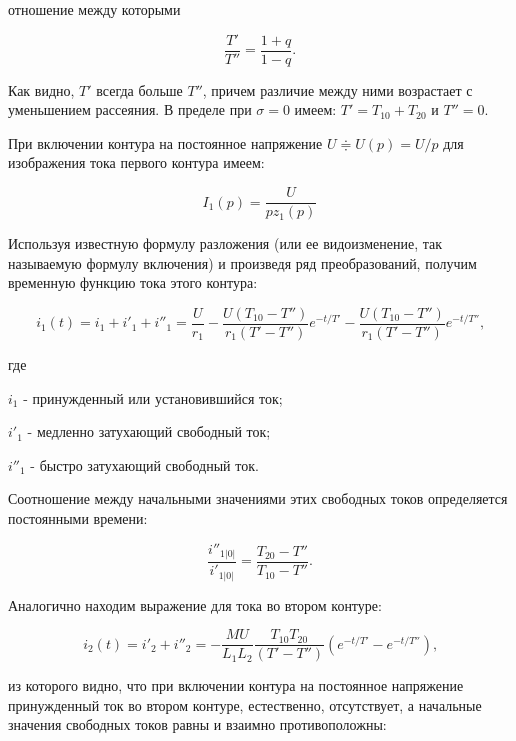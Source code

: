 отношение между которыми

\begin{equation}
    \label{eq:4-12 T'T''}
    \frac{T'}{T''}=\frac{1+q}{1-q}\text{.}
\end{equation}

Как видно, $ T' $ всегда больше $ T'' $, причем различие между ними возрастает с уменьшением рассеяния. В пределе при $ \sigma = 0 $ имеем: $ T' = T_{10} + T_{20} $ и $ T'' = 0 $.

При включении контура на постоянное напряжение $ U \Doteq U(p) = U/p $ для изображения тока первого контура имеем:

\begin{equation*}
    I_1(p)=\frac{U}{pz_1(p)}
\end{equation*}

Используя известную формулу разложения (или ее видоизменение, так называемую формулу включения) и произведя ряд преобразований, получим временную функцию тока этого контура:

\begin{equation}
    \label{eq:4-13 i_1}
    i_1(t)=i_1+i'_1+i''_1=\frac{U}{r_1}-\frac{U(T_{10}-T'')}{r_1(T'-T'')}e^{-t/T'}-\frac{U(T_{10}-T'')}{r_1(T'-T'')}e^{-t/T''}\text{,}
\end{equation}

где

$ i_1 $ - принужденный или установившийся ток;

$ i'_1 $ - медленно затухающий свободный ток;

$ i''_1 $ - быстро затухающий свободный ток.

Соотношение между начальными значениями этих свободных токов определяется постоянными времени:

\begin{equation}
    \label{eq:4-14 i_i}
    \frac{i''_{1|0|}}{i'_{1|0|}}=\frac{T_{20}-T''}{T_{10}-T''}\text{.}
\end{equation}

Аналогично находим выражение для тока во втором контуре:

\begin{equation}
    \label{eq:4-15 i_2}
    i_2(t)=i'_2+i''_2=-\frac{MU}{L_1L_2}\frac{T_{10}T_{20}}{(T'-T'')}(e^{-t/T'}-e^{-t/T''})\text{,}
\end{equation}

из которого видно, что при включении контура на постоянное напряжение принужденный ток во втором контуре, естественно, отсутствует, а начальные значения свободных токов равны и взаимно противоположны:

